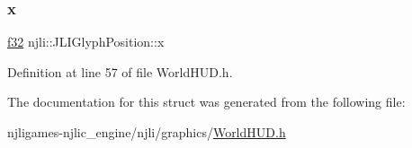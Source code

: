 \subsubsection{\texorpdfstring{x}{x}}
{\footnotesize\ttfamily \mbox{\hyperlink{_util_8h_a5f6906312a689f27d70e9d086649d3fd}{f32}} njli\+::\+J\+L\+I\+Glyph\+Position\+::x\hspace{0.3cm}{\ttfamily [private]}}



Definition at line 57 of file World\+H\+U\+D.\+h.



The documentation for this struct was generated from the following file\+:\begin{DoxyCompactItemize}
\item 
njligames-\/njlic\+\_\+engine/njli/graphics/\mbox{\hyperlink{_world_h_u_d_8h}{World\+H\+U\+D.\+h}}\end{DoxyCompactItemize}
